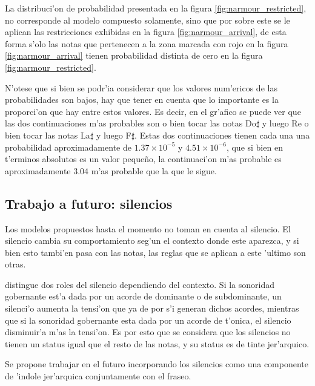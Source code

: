 La distribuci'on de probabilidad presentada en la figura \ref{fig:narmour_restricted}, no corresponde al modelo compuesto solamente, sino 
que por sobre este se le aplican las restricciones exhibidas en la figura \ref{fig:narmour_arrival}, de esta forma s'olo las notas que 
pertenecen a la zona marcada con rojo en la figura \ref{fig:narmour_arrival} tienen probabilidad distinta de cero en la figura \ref{fig:narmour_restricted}.

N'otese que si bien se podr'ia considerar que los valores num'ericos de las probabilidades son bajos, hay que tener en cuenta que lo 
importante es la proporci'on que hay entre estos valores. Es decir, en el gr'afico se puede ver que las dos continuaciones m'as 
probables son o bien tocar las notas Do$\sharp$ y luego Re o bien tocar las notas La$\sharp$ y luego F$\sharp$. Estas dos continuaciones 
tienen cada una una probabilidad aproximadamente de $1.37\times10^{-5}$ y $4.51\times10^{-6}$, que si bien en t'erminos absolutos es 
un valor pequeño, la continuaci'on m'as probable es aproximadamente $3.04$ m'as probable que la que le sigue. 

\subsection{Trabajo a futuro: silencios}
Los modelos propuestos hasta el momento no toman en cuenta al silencio. 
El silencio cambia su comportamiento seg'un el contexto donde este aparezca, y si bien esto tambi'en pasa con las notas, las reglas que se
aplican a este 'ultimo son otras. 

\cite{Margulis08} distingue dos roles del silencio dependiendo del contexto. Si la sonoridad gobernante est'a dada por un acorde de dominante
o de subdominante, un silenci'o aumenta la tensi'on que ya de por s'i generan dichos acordes, mientras que si la sonoridad gobernante
esta dada por un acorde de t'onica, el silencio disminuir'a m'as la tensi'on. Es por esto que se considera que los silencios no tienen 
un status igual que el resto de las notas, y su status es de tinte jer'arquico.

Se propone trabajar en el futuro incorporando los silencios como una componente de 'indole jer'arquica conjuntamente con el fraseo.
